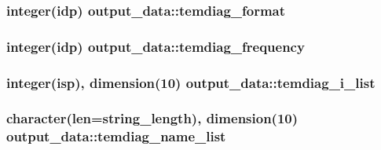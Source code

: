 \subsubsection[{\texorpdfstring{temdiag\+\_\+format}{temdiag_format}}]{\setlength{\rightskip}{0pt plus 5cm}integer(idp) output\+\_\+data\+::temdiag\+\_\+format}\hypertarget{namespaceoutput__data_a2f4ce5fdd4011f5db5c6b9de97cf133a}{}\label{namespaceoutput__data_a2f4ce5fdd4011f5db5c6b9de97cf133a}
\subsubsection[{\texorpdfstring{temdiag\+\_\+frequency}{temdiag_frequency}}]{\setlength{\rightskip}{0pt plus 5cm}integer(idp) output\+\_\+data\+::temdiag\+\_\+frequency}\hypertarget{namespaceoutput__data_ab55f479db67f7b4af32d0a55e2ba6620}{}\label{namespaceoutput__data_ab55f479db67f7b4af32d0a55e2ba6620}
\subsubsection[{\texorpdfstring{temdiag\+\_\+i\+\_\+list}{temdiag_i_list}}]{\setlength{\rightskip}{0pt plus 5cm}integer(isp), dimension(10) output\+\_\+data\+::temdiag\+\_\+i\+\_\+list}\hypertarget{namespaceoutput__data_a272ff12d370f1ddd453ed84e0aea955b}{}\label{namespaceoutput__data_a272ff12d370f1ddd453ed84e0aea955b}
\subsubsection[{\texorpdfstring{temdiag\+\_\+name\+\_\+list}{temdiag_name_list}}]{\setlength{\rightskip}{0pt plus 5cm}character(len=string\+\_\+length), dimension(10) output\+\_\+data\+::temdiag\+\_\+name\+\_\+list}\hypertarget{namespaceoutput__data_a891f4f8be197dbbfe91c01ee5260b4c2}{}\label{namespaceoutput__data_a891f4f8be197dbbfe91c01ee5260b4c2}
